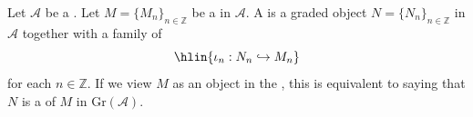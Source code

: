 \begin{definition} \label{definition:graded_subobject_of_a_graded_object_of_a_category}
    Let $\mathcal{A}$ be a . Let $M = \{M_n\}_{n \in \mathbb{Z}}$ be a  in $\mathcal{A}$. 
    A  is a graded object $N = \{N_n\}_{n \in \mathbb{Z}}$ in $\mathcal{A}$ together with a family of  
    $$\hlin{\iota_n: N_n \hookrightarrow M_n}$$
    for each $n \in \mathbb{Z}$. If we view $M$ as an object in the , this is equivalent to saying that $N$ is a  of $M$ in $\text{Gr}(\mathcal{A})$.
\end{definition}